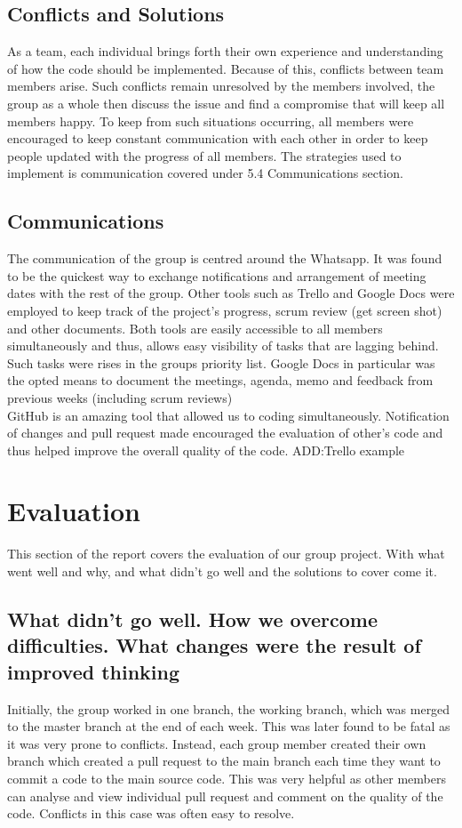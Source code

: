 \documentclass{article}[11pt,Tahoma]
\begin{document}
		\subsection{Conflicts and Solutions}
			As a team, each individual brings forth their own experience and understanding of how the code should be implemented.  Because of this, conflicts between team members arise.  Such conflicts remain unresolved by the members involved, the group as a whole then discuss the issue and find a compromise that will keep all members happy. To keep from such situations occurring, all members were encouraged to keep constant communication with each other in order to keep people updated with the progress of all members.  The strategies used to implement is communication covered under 5.4 Communications section.
			
		\subsection{Communications}
			The communication of the group is centred around the Whatsapp. It was found to be the quickest way to exchange notifications and arrangement of meeting dates with the rest of the group. Other tools such as Trello and Google Docs were employed to keep track of the project's progress, scrum review (get screen shot) and other documents. Both tools are easily accessible to all members simultaneously and thus, allows easy visibility of tasks that are lagging behind. Such tasks were rises in the groups priority list. Google Docs in particular was the opted means to document the meetings, agenda, memo and feedback from previous weeks (including scrum reviews)\\
			
			GitHub is an amazing tool that allowed us to coding simultaneously. Notification of changes and pull request made encouraged the evaluation of other's code and thus helped improve the overall quality of the code.
				ADD:Trello example
		
	\section{Evaluation}
		This section of the report covers the evaluation of our group project.  With what went well and why, and what didn't go well and the solutions to cover come it.
		\subsection{What didn't go well. How we overcome difficulties. What changes were the result of improved thinking }	
			Initially, the group worked in one branch, the working branch, which was merged to the master branch at the end of each week. This was later found to be fatal as it was very prone to conflicts.  Instead, each group member created their own branch which created a pull request to the main branch each time they want to commit a code to the main source code. This was very helpful as other members can analyse and view individual pull request and comment on the quality of the code.  Conflicts in this case was often easy to resolve.\\ 
			
\end{document}
